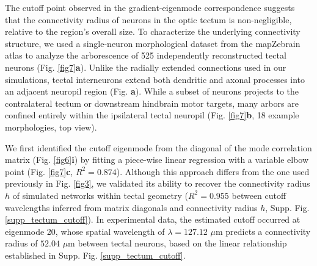 \documentclass{article}
\begin{document}
The cutoff point observed in the gradient-eigenmode correspondence suggests that the connectivity radius of neurons in the optic tectum is non-negligible, relative to the region's overall size. To characterize the underlying connectivity structure, we used a single-neuron morphological dataset from the mapZebrain atlas\cite{kunst2019cellular} to analyze the arborescence of 525 independently reconstructed tectal neurons (Fig. \ref{fig7}\textbf{a}). Unlike the radially extended connections used in our simulations, tectal interneurons extend both dendritic and axonal processes into an adjacent neuropil region\cite{robles2011characterization} (Fig. \textbf{a}). While a subset of neurons projects to the contralateral tectum or downstream hindbrain motor targets\cite{helmbrecht2018topography}, many arbors are confined entirely within the ipsilateral tectal neuropil (Fig. \ref{fig7}\textbf{b}, 18 example morphologies, top view). 

We first identified the cutoff eigenmode from the diagonal of the mode correlation matrix (Fig. \ref{fig6}\textbf{i}) by fitting a piece-wise linear regression with a variable elbow point (Fig. \ref{fig7}\textbf{c}, $R^2=0.874$). Although this approach differs from the one used previously in Fig. \ref{fig3}, we validated its ability to recover the connectivity radius $h$ of simulated networks within tectal geometry ($R^2=0.955$ between cutoff wavelengths inferred from matrix diagonals and connectivity radius $h$, Supp. Fig. \ref{supp_tectum_cutoff}). In experimental data, the estimated cutoff occurred at eigenmode 20, whose spatial wavelength of $\lambda=127.12$ $\mu$m predicts a connectivity radius of $52.04$ $\mu$m between tectal neurons, based on the linear relationship established in Supp. Fig. \ref{supp_tectum_cutoff}. 
\end{document}
